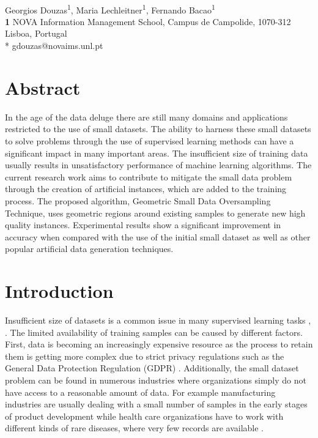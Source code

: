 \documentclass[10pt,letterpaper]{article}
\begin{document}
\vspace*{0.2in}
\begin{flushleft}
{\Large
\textbf{} %
}
\textbf{}
\newline
\\
Georgios Douzas\textsuperscript{1},
Maria Lechleitner\textsuperscript{1},
Fernando Bacao\textsuperscript{1}
\\
\bigskip
\textbf{1} NOVA Information Management School, Campus de Campolide, 1070-312 Lisboa, Portugal
\\
\bigskip
* gdouzas@novaims.unl.pt
\end{flushleft}

\section*{Abstract}
In the age of the data deluge there are still many domains and applications restricted to the use of small datasets. The ability to harness these small datasets to solve problems through the use of supervised learning methods can have a significant impact in many important areas. The insufficient size of training data usually results in unsatisfactory performance of machine learning algorithms. The current research work aims to contribute to mitigate the small data problem through the creation of artificial instances, which are added to the training process. The proposed algorithm, Geometric Small Data Oversampling Technique, uses geometric regions around existing samples to generate new high quality instances. Experimental results show a significant improvement in accuracy when compared with the use of the initial small dataset as well as other popular artificial data generation techniques.

\linenumbers

\section{Introduction}

Insufficient size of datasets is a common issue in many supervised learning tasks \cite{Niyogi.1998}, \cite{AbdulLateh.2017}. The limited availability of training samples can be caused by different factors. First, data is becoming an increasingly expensive resource \cite{Li.2007} as the process to retain them is getting more complex due to strict privacy regulations such as the General Data Protection Regulation (GDPR) \cite{EuropeanCommission.2019}. Additionally, the small dataset problem can be found in numerous industries where organizations simply do not have access to a reasonable amount of data. For example manufacturing industries are usually dealing with a small number of samples in the early stages of product development while health care organizations have to work with different kinds of rare diseases, where very few records are available \cite{AbdulLateh.2017}.
\end{document}
